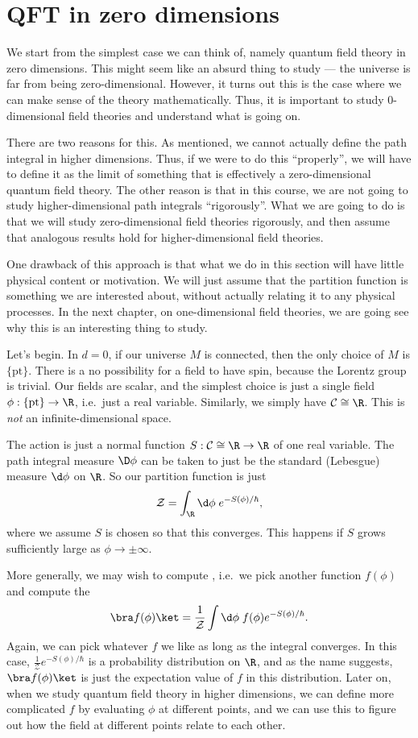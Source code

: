 \documentclass[a4paper]{article}
\begin{document}
\section{QFT in zero dimensions}
We start from the simplest case we can think of, namely quantum field theory in zero dimensions. This might seem like an absurd thing to study --- the universe is far from being zero-dimensional. However, it turns out this is the case where we can make sense of the theory mathematically. Thus, it is important to study 0-dimensional field theories and understand what is going on.

There are two reasons for this. As mentioned, we cannot actually define the path integral in higher dimensions. Thus, if we were to do this ``properly'', we will have to define it as the limit of something that is effectively a zero-dimensional quantum field theory. The other reason is that in this course, we are not going to study higher-dimensional path integrals ``rigorously''. What we are going to do is that we will study zero-dimensional field theories rigorously, and then assume that analogous results hold for higher-dimensional field theories.

One drawback of this approach is that what we do in this section will have little physical content or motivation. We will just assume that the partition function is something we are interested about, without actually relating it to any physical processes. In the next chapter, on one-dimensional field theories, we are going see why this is an interesting thing to study.

Let's begin. In $d = 0$, if our universe $M$ is connected, then the only choice of $M$ is $\{\mathrm{pt}\}$. There is a no possibility for a field to have spin, because the Lorentz group is trivial. Our fields are scalar, and the simplest choice is just a single field $\phi: \{\mathrm{pt}\} \to \R$, i.e.\ just a real variable. Similarly, we simply have $\mathcal{C} \cong \R$. This is \emph{not} an infinite-dimensional space.

The action is just a normal function $S: \mathcal{C} \cong \R \to \R$ of one real variable. The path integral measure $\D \phi$ can be taken to just be the standard (Lebesgue) measure $\d \phi$ on $\R$. So our partition function is just
\[
  \mathcal{Z} = \int_\R \d \phi\; e^{-S(\phi)/\hbar},
\]
where we assume $S$ is chosen so that this converges. This happens if $S$ grows sufficiently large as $\phi \to \pm \infty$.

More generally, we may wish to compute , i.e.\ we pick another function $f(\phi)$ and compute the 
\[
  \bra f(\phi)\ket = \frac{1}{\mathcal{Z}} \int \d \phi\; f(\phi) e^{-S(\phi)/\hbar}.
\]
Again, we can pick whatever $f$ we like as long as the integral converges. In this case, $\frac{1}{\mathcal{Z}} e^{-S(\phi)/\hbar}$ is a probability distribution on $\R$, and as the name suggests, $\bra f(\phi)\ket$ is just the expectation value of $f$ in this distribution. Later on, when we study quantum field theory in higher dimensions, we can define more complicated $f$ by evaluating $\phi$ at different points, and we can use this to figure out how the field at different points relate to each other.
\end{document}
